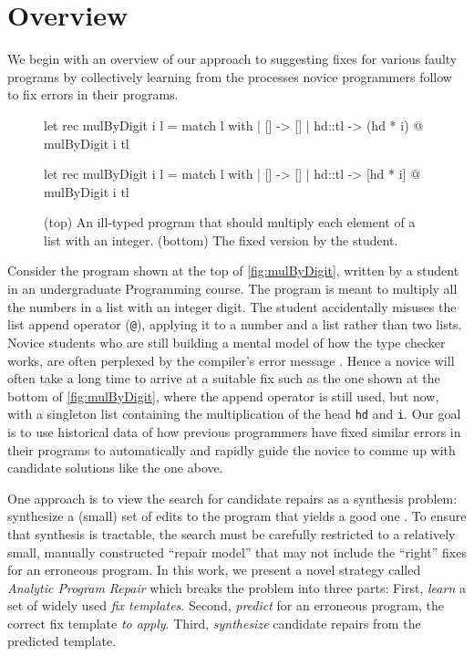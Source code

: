 \section{Overview}
\label{sec:overview}

We begin with an overview of our approach to suggesting fixes for various faulty
programs by collectively learning from the processes novice programmers follow
to fix errors in their programs.

\begin{figure}[ht]
\begin{ecode}
let rec mulByDigit i l =
  match l with
  | []     -> []
  | hd::tl -> (hd * i) @ mulByDigit i tl
\end{ecode}

\begin{ecode}
let rec mulByDigit i l =
  match l with
  | []     -> []
  | hd::tl -> [hd * i] @ mulByDigit i tl
\end{ecode}
\caption{(top) An ill-typed \ocaml program that should multiply each element
of a list with an integer. (bottom) The fixed version by the student.}
\label{fig:mulByDigit}
\end{figure}


 Consider the program \mbd shown at the top of
\autoref{fig:mulByDigit}, written by a student in an undergraduate Programming
course. The program is meant to multiply all the numbers in a list with an
integer digit. The student accidentally misuses the list append operator
(\texttt{@}), applying it to a number and a list rather than two lists.
%
Novice students who are still building a mental model of how the type checker
works, are often perplexed by the compiler's error message \cite{fixme}. Hence a
novice will often take a long time to arrive at a suitable fix such as the one
shown at the bottom of \autoref{fig:mulByDigit}, where the append operator is
still used, but now, with a singleton list containing the multiplication of the
head \texttt{hd} and \texttt{i}.
%
Our goal is to use historical data of how previous programmers have fixed
similar errors in their programs to automatically and rapidly guide the novice
to comme up with candidate solutions like the one above.


%
One approach is to view the search for candidate repairs as a synthesis problem:
synthesize a (small) set of edits to the program that yields a good one
\cite{singh2013, fixme}.
%
To ensure that synthesis is tractable, the search must be carefully restricted
to a relatively small, manually constructed ``repair model'' that may not
include the ``right'' fixes for an erroneous program.
%
In this work, we present a novel strategy called \emph{Analytic Program
Repair} which breaks the problem into three parts:
%
First, \emph{learn} a set of widely used \emph{fix templates}.
%
Second, \emph{predict} for an erroneous program, the correct fix template
\emph{to apply}.
%
Third, \emph{synthesize} candidate repairs from the predicted template.


